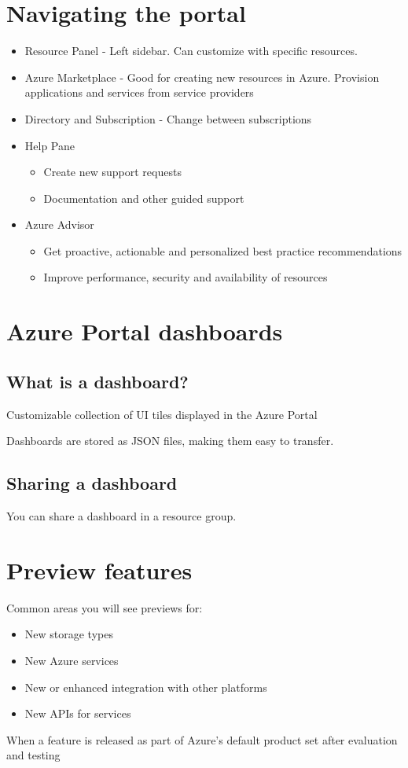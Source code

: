 \documentclass{article}[18pt]
\begin{document}
\section{Navigating the portal}
\begin{itemize}
	\item Resource Panel - Left sidebar. Can customize with specific resources.
	\item Azure Marketplace - Good for creating new resources in Azure. Provision applications and services from service providers
	\item Directory and Subscription - Change between subscriptions
	\item Help Pane
	\begin{itemize}
		\item Create new support requests
		\item Documentation and other guided support
	\end{itemize}
	\item Azure Advisor
	\begin{itemize}
		\item Get proactive, actionable and personalized best practice recommendations
		\item Improve performance, security and availability of resources
	\end{itemize}
	
\end{itemize}
\section{Azure Portal dashboards}
\subsection{What is a dashboard?}
\begin{definition}[Dashboard]
	Customizable collection of UI tiles displayed in the Azure Portal
\end{definition}
Dashboards are stored as JSON files, making them easy to transfer.
\subsection{Sharing a dashboard}
You can share a dashboard in a resource group.
\section{Preview features}
Common areas you will see previews for:
\begin{itemize}
	\item New storage types
	\item New Azure services
	\item New or enhanced integration with other platforms
	\item New APIs for services
\end{itemize}
\begin{definition}
	When a feature is released as part of Azure's default product set after evaluation and testing
\end{definition}
\end{document}
